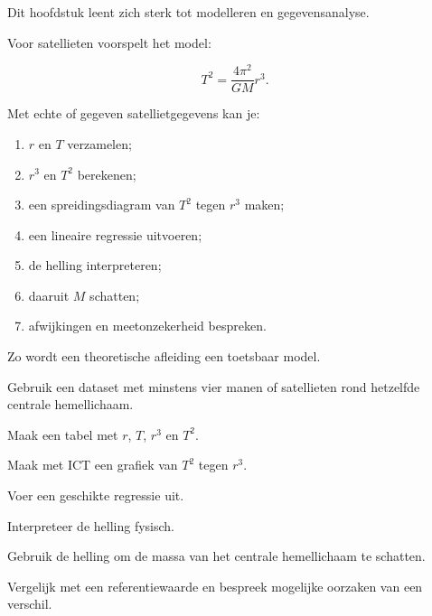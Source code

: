\documentclass{ximera}
\begin{document}


Dit hoofdstuk leent zich sterk tot modelleren en gegevensanalyse.

Voor satellieten voorspelt het model:

\[
T^2=\frac{4\pi^2}{GM}r^3.
\]

Met echte of gegeven satellietgegevens kan je:

\begin{enumerate}
  \item $r$ en $T$ verzamelen;
  \item $r^3$ en $T^2$ berekenen;
  \item een spreidingsdiagram van $T^2$ tegen $r^3$ maken;
  \item een lineaire regressie uitvoeren;
  \item de helling interpreteren;
  \item daaruit $M$ schatten;
  \item afwijkingen en meetonzekerheid bespreken.
\end{enumerate}

Zo wordt een theoretische afleiding een toetsbaar model.


\begin{oefening}{\oefU\ESS}

Gebruik een dataset met minstens vier manen of satellieten rond
hetzelfde centrale hemellichaam.

\begin{question}
Maak een tabel met $r$, $T$, $r^3$ en $T^2$.
\end{question}

\begin{question}
Maak met ICT een grafiek van $T^2$ tegen $r^3$.
\end{question}

\begin{question}
Voer een geschikte regressie uit.
\end{question}

\begin{question}
Interpreteer de helling fysisch.
\end{question}

\begin{question}
Gebruik de helling om de massa van het centrale hemellichaam te
schatten.
\end{question}

\begin{question}
Vergelijk met een referentiewaarde en bespreek mogelijke oorzaken van
een verschil.
\end{question}

\end{oefening}
\end{document}
